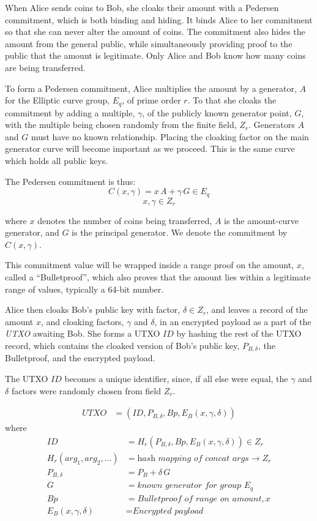 \documentclass[a4paper, 10pt, conference]{ieeeconf}
\begin{document}
When Alice sends coins to Bob, she cloaks their amount with a Pedersen commitment, which is both binding and hiding. It binds Alice to her commitment so that she can never alter the amount of coins. The commitment also hides the amount from the general public, while simultaneously providing proof to the public that the amount is legitimate.  Only Alice and Bob know how many coins are being transferred. 

To form a Pedersen commitment, Alice multiplies the amount by a generator, $A$ for the Elliptic curve group, $E_q$, of prime order $r$. To that she cloaks the commitment by adding a multiple, $\gamma$, of the publicly known generator point, $G$, with the multiple being chosen randomly from the finite field, $Z_r$. Generators $A$ and $G$ must have no known relationship. Placing the cloaking factor on the main generator curve will become important as we proceed. This is the same curve which holds all public keys. 

The Pedersen commitment is thus:
$$ C(x, \gamma) = x \, A + \gamma \, G \in E_q$$
$$x, \gamma \in Z_r$$

where $x$ denotes the number of coins being transferred, $A$ is the amount-curve generator, and $G$ is the principal generator. We denote the commitment by $C(x, \gamma)$. 

This commitment value will be wrapped inside a range proof on the amount, $x$, called a ``Bulletproof'', which also proves that the amount lies within a legitimate range of values, typically a 64-bit number.

Alice then cloaks Bob's public key with factor, $\delta \in Z_r$, and leaves a record of the amount $x$, and cloaking factors, $\gamma$ and $\delta$, in an encrypted payload as a part of the \textit{UTXO} awaiting Bob. She forms a UTXO $\mathit{ID}$ by hashing the rest of the UTXO record, which contains the cloaked version of Bob's public key, $P_{B, \delta}$, the Bulletproof, and the encrypted payload. 

The UTXO $\mathit{ID}$ becomes a unique identifier, since, if all else were equal, the $\gamma$ and $\delta$ factors were randomly chosen from field $Z_r$.

\begin{align*}
UTXO &= (ID, P_{B, \delta}, Bp, E_B(x, \gamma, \delta))
\end{align*}
where
\begin{align*}
ID &= H_r(P_{B, \delta}, Bp, E_B(x, \gamma, \delta)) \in Z_r \\
H_r(arg_1, arg_2, ...) &= \textit{hash mapping of concat args} \rightarrow Z_r \\
P_{B, \delta} &= P_B + \delta \, G \\
G &= \textit{known generator for group } E_q \\
Bp &= \textit{Bulletproof of range on amount}, x \\
E_B(x, \gamma, \delta) &= \textit{Encrypted payload}
\end{align*}
\end{document}
